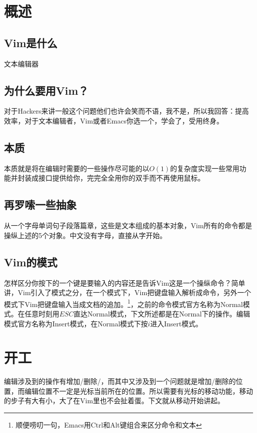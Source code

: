 \section{概述}
\subsection{Vim是什么}
文本编辑器
\subsection{为什么要用Vim？}
对于Hackers来讲一般这个问题他们也许会笑而不语，我不是，所以我回答：提高效率，对于文本编辑者，Vim或者Emacs你选一个，学会了，受用终身。
\subsection{本质}
本质就是将在编辑时需要的一些操作尽可能的以$O(1)$的复杂度实现一些常用功能并封装成接口提供给你，完完全全用你的双手而不再使用鼠标。
\subsection{再罗嗦一些抽象}
从一个字母\rightarrow 单词\rightarrow 句子\rightarrow 段落\rightarrow 篇章，这些是文本组成的基本对象，Vim所有的命令都是操纵上述的5个对象。中文没有字母，直接从字开始。
\subsection{Vim的模式}
怎样区分你按下的一个键是要输入的内容还是告诉Vim这是一个操纵命令？简单讲，Vim引入了模式之分，在一个模式下，Vim把键盘输入解析成命令，另外一个模式下Vim把键盘输入当成文档的追加。\footnote{顺便唠叨一句，Emacs用Ctrl和Alt键组合来区分命令和文本}，之前的命令模式官方名称为Normal模式。在任意时刻用$ESC$直达Normal模式，下文所述都是在Normal下的操作。编辑模式官方名称为Insert模式，在Normal模式下按$i$进入Insert模式。
\section{开工}
编辑涉及到的操作有增加/删除/，而其中又涉及到一个问题就是增加/删除的位置，而编辑位置不一定是光标当前所在的位置。所以需要有光标的移动功能，移动的步子有大有小，大了在Vim里也不会扯着蛋。下文就从移动开始讲起。

